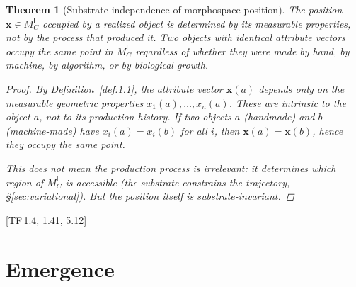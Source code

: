 \documentclass[10pt]{article}
\theoremstyle{definition}
\theoremstyle{plain}
\newtheorem{theorem}[definition]{Theorem}
\theoremstyle{remark}
\newcommand{\MC}{M^{\mathsf{I}}_C}          %
\newcommand{\TF}[1]{\textnormal{[TF\,#1]}}  %
\begin{document}
\begin{theorem}[Substrate independence of morphospace position]%
\label{thm:7.2}
The position $\bm{x} \in \MC$ occupied by a realized object is
determined by its measurable properties, not by the process that
produced it. Two objects with identical attribute vectors occupy the
same point in $\MC$ regardless of whether they were made by hand, by
machine, by algorithm, or by biological growth.

\begin{proof}
By Definition~\ref{def:1.1}, the attribute vector $\bm{x}(a)$ depends
only on the measurable geometric properties $x_1(a), \ldots, x_n(a)$.
These are intrinsic to the object $a$, not to its production history.
If two objects $a$ (handmade) and $b$ (machine-made) have
$x_i(a) = x_i(b)$ for all $i$, then $\bm{x}(a) = \bm{x}(b)$,
hence they occupy the same point.

This does \emph{not} mean the production process is irrelevant: it
determines which region of $\MC$ is accessible (the substrate constrains
the trajectory, \S\ref{sec:variational}). But the position itself is
substrate-invariant. \qedhere
\end{proof}
\end{theorem}

\TF{1.4, 1.41, 5.12}

\newpage
\section{Emergence}\label{sec:emergence}
\end{document}
